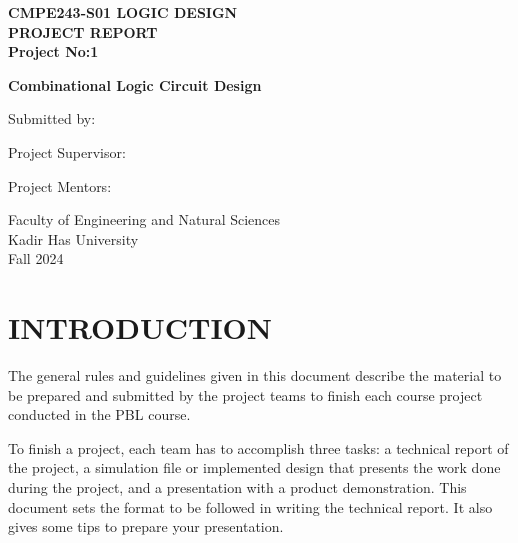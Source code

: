 \documentclass[12pt]{article} %
\numberwithin{equation}{section}
\numberwithin{figure}{section}
\numberwithin{table}{section}
\numberwithin{algorithm}{section}
\begin{document}
\begin{titlepage}
    \centering
    \vspace*{26pt}
    
    {\fontsize{14}{16}\selectfont \textbf{CMPE243-S01 LOGIC DESIGN}\\}
    {\fontsize{14}{16} \selectfont \textbf{PROJECT REPORT}}\\
    {\fontsize{14}{16} \selectfont \textbf{Project No:1}}\\
    \vspace{2.117cm}
    
    
    {\fontsize{16}{18}\selectfont \textbf{Combinational Logic Circuit Design}}\\
    \vspace{3cm}
    
    
    Submitted by:\\
    \vspace{2cm}
    
    Project Supervisor:\\
    \vspace{1.5cm}
    
    Project Mentors:\\
    \vspace{4cm}
    
    
    Faculty of Engineering and Natural Sciences\\
    Kadir Has University\\
    Fall 2024
    
\end{titlepage}

\newpage
{}
\setcounter{page}{2}

\tableofcontents
\thispagestyle{empty}

\section{INTRODUCTION}

The general rules and guidelines given in this document describe the material to be prepared and submitted by the project teams to finish each course project conducted in the PBL course.

To finish a project, each team has to accomplish three tasks: a technical report of the project, a simulation file or implemented design that presents the work done during the project, and a presentation with a product demonstration. This document sets the format to be followed in writing the technical report.  It also gives some tips to prepare your presentation.
\end{document}
